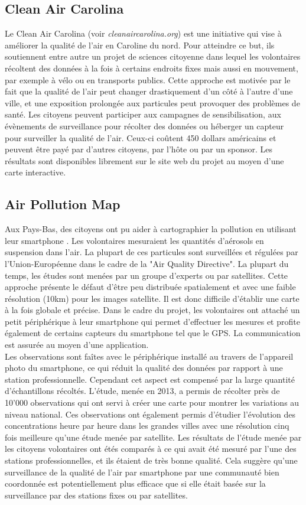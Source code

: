 \documentclass[10pt, article]{llncs}
\begin{document}
	\subsection{Clean Air Carolina}
		Le Clean Air Carolina (voir \textit{cleanaircarolina.org}) est une initiative qui vise à améliorer la qualité de l'air en Caroline du nord. Pour atteindre ce but, ils soutiennent entre autre un projet de sciences citoyenne dans lequel les volontaires récoltent des données à la fois à certains endroits fixes mais aussi en mouvement, par exemple à vélo ou en transports publics. Cette approche est motivée par le fait que la qualité de l'air peut changer drastiquement d'un côté à l'autre d'une ville, et une exposition prolongée aux particules peut provoquer des problèmes de santé. Les citoyens peuvent participer aux campagnes de sensibilisation, aux évènements de surveillance pour récolter des données ou héberger un capteur pour surveiller la qualité de l'air. Ceux-ci coûtent 450 dollars américains et peuvent être payé par d'autres citoyens, par l'hôte ou par un sponsor. Les résultats sont disponibles librement sur le site web du projet au moyen d'une carte interactive.
		
	\subsection{Air Pollution Map}
		Aux Pays-Bas, des citoyens ont pu aider à cartographier la pollution en utilisant leur smartphone \cite{smith_citizen_2015}. Les volontaires mesuraient les quantités d'aérosols en suspension dans l'air. La plupart de ces particules sont surveillées et régulées par l'Union-Européenne dans le cadre de la "Air Quality Directive". La plupart du temps, les études sont menées par un groupe d'experts ou par satellites. Cette approche présente le défaut d'être peu distribuée spatialement et avec une faible résolution (10km) pour les images satellite. Il est donc difficile d'établir une carte à la fois globale et précise. Dans le cadre du projet, les volontaires ont attaché un petit périphérique à leur smartphone qui permet d'effectuer les mesures et profite également de certains capteurs du smartphone tel que le GPS. La communication est assurée au moyen d'une application.\\
		Les observations sont faîtes avec le périphérique installé au travers de l'appareil photo du smartphone, ce qui réduit la qualité des données par rapport à une station professionnelle. Cependant cet aspect est compensé par la large quantité d'échantillons récoltés. L'étude, menée en 2013, a permis de récolter près de 10'000 observations qui ont servi à créer une carte pour montrer les variations au niveau national. Ces observations ont également permis d'étudier l'évolution des concentrations heure par heure dans les grandes villes avec une résolution cinq fois meilleure qu'une étude menée par satellite. Les résultats de l'étude menée par les citoyens volontaires ont étés comparés à ce qui avait été mesuré par l'une des stations professionnelles, et ils étaient de très bonne qualité. Cela suggère qu'une surveillance de la qualité de l'air par smartphone par une communauté bien coordonnée est potentiellement plus efficace que si elle était basée sur la surveillance par des stations fixes ou par satellites.
		
\end{document}
